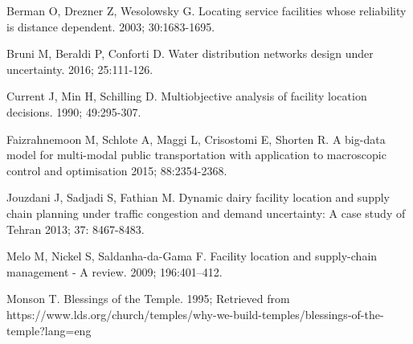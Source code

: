 \documentclass[twoside,twocolumn]{article}
\begin{document}
\begin{thebibliography}{99} %

Berman O, Drezner Z, Wesolowsky G.
\newblock Locating service facilities whose reliability is distance dependent.
 2003; 30:1683-1695.

Bruni M, Beraldi P, Conforti D.
\newblock Water distribution networks design under uncertainty.
 2016; 25:111-126.

Current J, Min H, Schilling D.
\newblock Multiobjective analysis of facility location decisions.
 1990; 49:295-307.


Faizrahnemoon M, Schlote A, Maggi L, Crisostomi E, Shorten R.
\newblock A big-data model for multi-modal public transportation with application to macroscopic control and optimisation
 2015; 88:2354-2368.

Jouzdani J, Sadjadi S, Fathian M.
\newblock Dynamic dairy facility location and supply chain planning under traffic congestion and demand uncertainty: A case study of Tehran
 2013; 37: 8467-8483.

Melo M, Nickel S, Saldanha-da-Gama F.
\newblock Facility location and supply-chain management - A review.
  2009; 196:401--412.

Monson T.
\newblock Blessings of the Temple. 1995;
\newblock Retrieved from https://www.lds.org/church/temples/why-we-build-temples/blessings-of-the-temple?lang=eng


\end{thebibliography}
\end{document}
